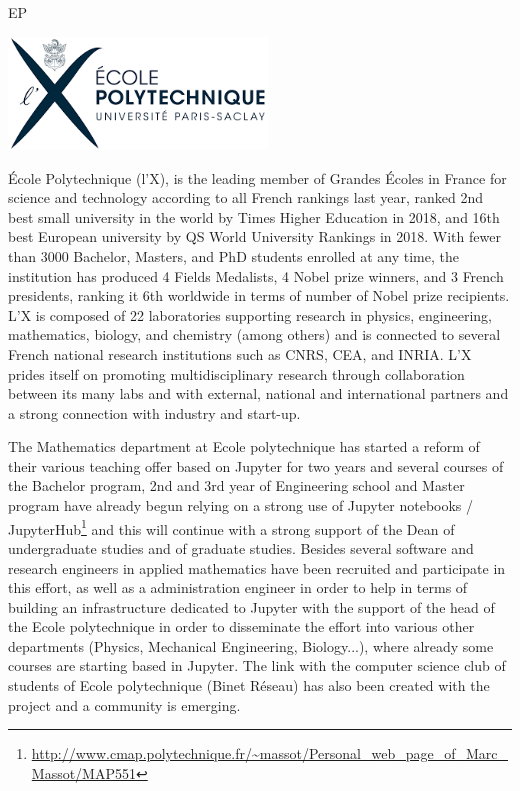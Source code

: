 \begin{sitedescription}{EP}

\begin{center}
\includegraphics[height=3cm]{Participants/Logos/EP.png}
\end{center}

\'Ecole Polytechnique (l'X), is the leading member of Grandes \'Ecoles in France
for science and technology according to all French rankings last year, ranked
2nd best small university in the world by Times Higher Education in 2018, and
16th best European university by QS World University Rankings in 2018. With
fewer than 3000 Bachelor, Masters, and PhD students enrolled at any time, the
institution has produced 4 Fields Medalists, 4 Nobel prize winners, and 3 French
presidents, ranking it 6th worldwide in terms of number of Nobel prize
recipients. L'X is composed of 22 laboratories supporting research in physics,
engineering, mathematics, biology, and chemistry (among others) and is connected
to several French national research institutions such as CNRS, CEA, and INRIA.
L'X prides itself on promoting multidisciplinary research through collaboration
between its many labs and with external, national and international partners and
a strong connection with industry and start-up.

The Mathematics department at Ecole polytechnique has started a reform of their
various teaching offer based on Jupyter for two years and several courses of the
Bachelor program, 2nd and 3rd year of Engineering school and Master program have
already begun relying on a strong use of Jupyter notebooks /
JupyterHub\footnote{\url{http://www.cmap.polytechnique.fr/~massot/Personal_web_page_of_Marc_Massot/MAP551}} and this will continue with a strong support of the Dean of
undergraduate studies and of graduate studies. Besides several software and
research engineers in applied mathematics have been recruited and participate in
this effort, as well as a administration engineer in order to help in terms of
building an infrastructure dedicated to Jupyter with the support of the head of
the Ecole polytechnique in order to disseminate the effort into various other
departments (Physics, Mechanical Engineering, Biology...), where already some
courses are starting based in Jupyter. The link with the computer science club
of students of Ecole polytechnique (Binet R\'eseau) has also been created with
the project and a community is emerging.


\end{sitedescription}
